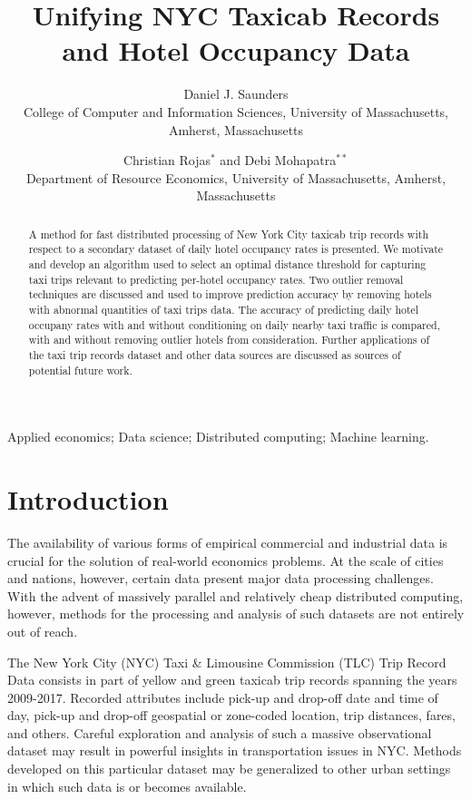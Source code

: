 \documentclass[useAMS, usenatbib]{biom}
\title{Unifying NYC Taxicab Records and Hotel Occupancy Data}
\author
{Daniel J. Saunders \emailx{djsaunde@cs.umass.edu} \\
College of Computer and Information Sciences, University of Massachusetts, Amherst, Massachusetts
\and
Christian Rojas$^{*}$\email{rojas@resecon.umass.edu} and
Debi Mohapatra$^{**}$\email{dmohapatra@umass.edu} \\
Department of Resource Economics, University of Massachusetts, 
Amherst, Massachusetts}
\begin{document}
\label{firstpage}

\begin{abstract}
A method for fast distributed processing of New York City taxicab trip records with respect to a secondary dataset of daily hotel occupancy rates is presented. We motivate and develop an algorithm used to select an optimal distance threshold for capturing taxi trips relevant to predicting per-hotel occupancy rates. Two outlier removal techniques are discussed and used to improve prediction accuracy by removing hotels with abnormal quantities of taxi trips data. The accuracy of predicting daily hotel occupany rates with and without conditioning on daily nearby taxi traffic is compared, with and without removing outlier hotels from consideration. Further applications of the taxi trip records dataset and other data sources are discussed as sources of potential future work.
\end{abstract}

\begin{keywords}
Applied economics; Data science; Distributed computing; Machine learning.
\end{keywords}

\maketitle

\section{Introduction}
\label{s:intro}

The availability of various forms of empirical commercial and industrial data is crucial for the solution of real-world economics problems. At the scale of cities and nations, however, certain data present major data processing challenges. With the advent of massively parallel and relatively cheap distributed computing, however, methods for the processing and analysis of such datasets are not entirely out of reach.

The New York City (NYC) Taxi \& Limousine Commission (TLC) Trip Record Data consists in part of yellow and green taxicab trip records spanning the years 2009-2017. Recorded attributes include pick-up and drop-off date and time of day, pick-up and drop-off geospatial or zone-coded location, trip distances, fares, and others. Careful exploration and analysis of such a massive observational dataset may result in powerful insights in transportation issues in NYC. Methods developed on this particular dataset may be generalized to other urban settings in which such data is or becomes available.
\end{document}
